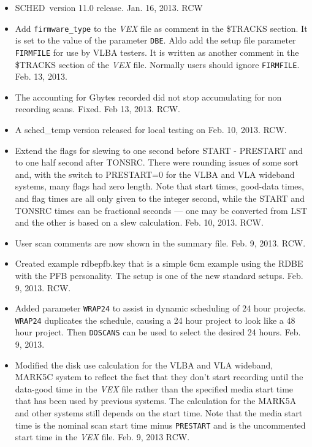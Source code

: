 \documentclass{report}
\newcommand{\schedb}{{\sc SCHED~}}
\begin{document}
\begin{itemize}

\item \schedb version 11.0 release.  Jan. 16, 2013. RCW 

\item Add {\tt firmware\_type} to the {\sl VEX} file as comment in the
\$TRACKS section.  It is set to the value of the parameter {\tt DBE}.
Aldo add the setup file parameter {\tt FIRMFILE} for use by VLBA
testers.  It is written as another comment in the \$TRACKS section of
the {\sl VEX} file.  Normally users should ignore {\tt FIRMFILE}.
Feb. 13, 2013.

\item The accounting for Gbytes recorded did not stop accumulating
for non recording scans.  Fixed.  Feb 13, 2013.  RCW.

\item A sched\_temp version released for local testing on Feb. 10, 
2013.  RCW.

\item Extend the flags for slewing to one second before START
- PRESTART and to one half second after TONSRC.  There were
rounding issues of some sort and, with the switch to PRESTART=0
for the VLBA and VLA wideband systems, many flags had zero 
length.  Note that start times, good-data times, and flag times
are all only given to the integer second, while the START and
TONSRC times can be fractional seconds --- one may be converted
from LST and the other is based on a slew calculation.  Feb. 10,
2013.  RCW.

\item User scan comments are now shown in the summary file.
Feb. 9, 2013.  RCW.

\item Created example rdbepfb.key that is a simple 6cm example using
the RDBE with the PFB personality.  The setup is one of the new
standard setups. Feb. 9, 2013.  RCW.

\item Added parameter {\tt WRAP24} to assist in dynamic scheduling
of 24 hour projects.  {\tt WRAP24} duplicates the schedule, causing
a 24 hour project to look like a 48 hour project.  Then {\tt DOSCANS}
can be used to select the desired 24 hours.  Feb. 9, 2013.

\item Modified the disk use calculation for the VLBA and VLA wideband,
MARK5C system to reflect the fact that they don't start recording
until the data-good time in the {\sl VEX} file rather than the
specified media start time that has been used by previous systems.
The calculation for the MARK5A and other systems still depends on the
start time.  Note that the media start time is the nominal scan start
time minus {\tt PRESTART} and is the uncommented start time in the
{\sl VEX} file.  Feb. 9, 2013  RCW.


\end{itemize}
\end{document}
